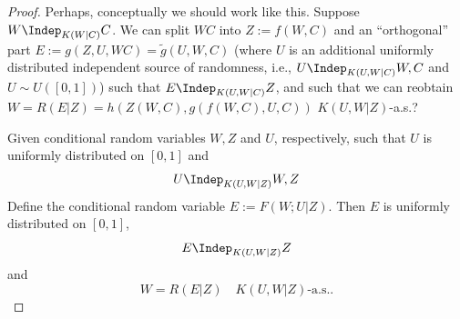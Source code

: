 \begin{proof}
  Perhaps, conceptually we should work like this. Suppose $W \Indep_{K(W|C)} C$. 
  We can split $WC$ into $Z:=f(W,C)$ and
  an ``orthogonal'' part $E:=g(Z,U,WC)=\tilde{g}(U,W,C)$ (where $U$ is an additional uniformly distributed independent source of randomness, i.e., $U \Indep_{K(U,W|C)} W,C$ and $U \sim U([0,1])$)
  such that $E \Indep_{K(U,W|C)} Z$, and such that we can reobtain $W = R(E|Z) = h(Z(W,C),g(f(W,C),U,C))$
  $K(U,W|Z)$-a.s.?

  Given conditional random variables $W,Z$ and $U$, respectively, such that $U$ is uniformly distributed on $[0,1]$ and 
\[ U \Indep_{K(U,W|Z)} W,Z \]
Define the conditional random variable $E := F(W;U|Z)$. Then $E$ is uniformly distributed on $[0,1]$,
\[ E \Indep_{K(U,W|Z)} Z \]
and 
\[ W = R(E|Z) \quad K(U,W|Z)\text{-a.s.}.\]
\end{proof}
